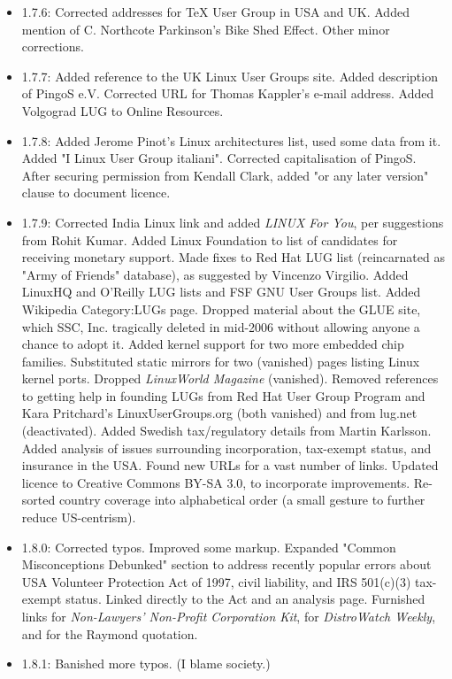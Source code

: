 \begin{itemize}
\item 1.7.6: Corrected addresses for TeX User Group in USA and
UK.  Added mention of C. Northcote Parkinson's Bike Shed Effect.  Other 
minor corrections.
\item 1.7.7: Added reference to the UK Linux User Groups site.
Added description of PingoS e.V.  Corrected URL for Thomas Kappler's 
e-mail address.  Added Volgograd LUG to Online Resources.
\item 1.7.8: Added Jerome Pinot's Linux architectures list,
used some data from it.  Added "I Linux User Group italiani".  
Corrected capitalisation of PingoS.  After securing permission from
Kendall Clark, added "or any later version" clause to document licence.
\item 1.7.9: Corrected India Linux link and added 
{\itshape LINUX For You\/}, per suggestions from Rohit Kumar.  Added Linux 
Foundation to list of candidates for receiving monetary support.  Made fixes 
to Red Hat LUG list (reincarnated as "Army of Friends" database), as suggested 
by Vincenzo Virgilio. Added LinuxHQ and O'Reilly LUG lists and FSF GNU User 
Groups list.  Added Wikipedia Category:LUGs page.  Dropped material about the 
GLUE site, which SSC, Inc.  tragically deleted in mid-2006 without allowing 
anyone a chance to adopt it.  Added kernel support for two more embedded chip 
families.  Substituted static mirrors for two (vanished) pages listing 
Linux kernel ports.  Dropped {\itshape LinuxWorld Magazine\/} (vanished).  
Removed references to getting help in founding LUGs from Red Hat User 
Group Program and Kara Pritchard's LinuxUserGroups.org (both vanished) 
and from lug.net (deactivated).  Added Swedish tax/regulatory details 
from Martin Karlsson.  Added analysis of issues surrounding incorporation, 
tax-exempt status, and insurance in the USA.  Found new URLs for a vast 
number of links.  Updated licence to Creative Commons BY-SA 3.0, to 
incorporate improvements.  Re-sorted country coverage into alphabetical 
order (a small gesture to further reduce US-centrism).
\item 1.8.0:  Corrected typos.  Improved some markup.  Expanded "Common Misconceptions Debunked" section to address recently popular errors about USA Volunteer Protection Act of 1997, civil liability, and IRS 501(c)(3) tax-exempt status.  Linked directly to the Act and an analysis page.  Furnished links for {\itshape Non-Lawyers' Non-Profit Corporation Kit\/}, for {\itshape DistroWatch Weekly\/}, and for the Raymond quotation.
\item 1.8.1:  Banished more typos.  (I blame society.)

\end{itemize}
